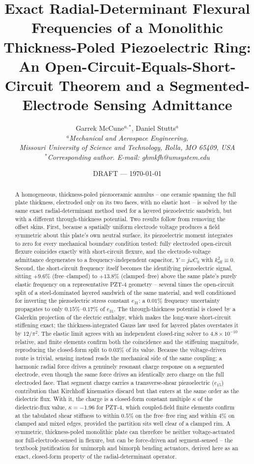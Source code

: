\documentclass[11pt]{article}
\title{\bfseries Exact Radial-Determinant Flexural Frequencies of a
Monolithic Thickness-Poled Piezoelectric Ring: An Open-Circuit-Equals-Short-Circuit Theorem and a Segmented-Electrode Sensing Admittance}
\author{Garrek McCune$^{a,*}$, Daniel Stutts$^{a}$\\
\small\itshape $^a$Mechanical and Aerospace Engineering,\\
Missouri University of Science and Technology, Rolla, MO 65409, USA\\
\small\upshape $^*$Corresponding author. E-mail: ghmkfh@umsystem.edu}
\date{DRAFT --- \today}
\begin{document}
\maketitle

\begin{abstract}
A homogeneous, thickness-poled piezoceramic annulus -- one ceramic
spanning the full plate thickness, electroded only on its two faces, with
no elastic host -- is solved by the same exact radial-determinant method
used for a layered piezoelectric sandwich, but with a different
through-thickness potential. Two results follow from removing the offset
skins. First, because a spatially uniform electrode voltage produces a
field symmetric about this plate's own neutral surface, its piezoelectric
moment integrates to zero for every mechanical boundary condition tested:
fully electroded open-circuit flexure coincides exactly with short-circuit
flexure, and the electrode-voltage admittance degenerates to a
frequency-independent capacitor, $Y=j\omega C_0$ with
$k_{\mathrm{eff}}^2\equiv0$. Second, the short-circuit frequency itself
becomes the identifying piezoelectric signal, sitting $+9.6\%$
(free--clamped) to $+13.8\%$ (clamped--free) above the same plate's purely
elastic frequency on a representative PZT-4 geometry -- several times
the open-circuit split of a steel-dominated layered sandwich of the same
material, and well conditioned for inverting the piezoelectric
stress constant $e_{31}$: a $0.01\%$ frequency uncertainty propagates to
only $0.15\%$--$0.17\%$ of $e_{31}$. The through-thickness potential is
closed by a Galerkin projection of the electric enthalpy, which makes the
long-wave short-circuit stiffening exact; the thickness-integrated Gauss
law used for layered plates overstates it by $12/\pi^2$. The elastic
limit agrees with an independent closed-ring solver to
$4.8\times10^{-10}$ relative, and finite elements confirm both the
coincidence and the stiffening magnitude, reproducing the closed-form
split to $0.03\%$ of its value. Because the voltage-driven route
is trivial, sensing instead reads the mechanical side of the same
coupling: a harmonic radial force drives a genuinely resonant charge
response on a segmented electrode, even though the same force drives an
identically zero charge on the full electroded face. That segment charge
carries a transverse-shear piezoelectric ($e_{15}$) contribution that
Kirchhoff kinematics discard but that enters at the same order as the
dielectric flux. With it, the charge is a closed-form constant multiple
$\kappa$ of the dielectric-flux value, $\kappa=-1.96$ for PZT-4, which
coupled-field finite elements confirm at the tabulated shear stiffness
to within $0.5\%$ on the free--free ring and within $4\%$ on clamped and
mixed edges, provided the partition sits well clear of a clamped
rim. A symmetric,
thickness-poled monolithic plate can therefore be neither voltage-actuated
nor full-electrode-sensed in flexure, but can be force-driven and
segment-sensed -- the textbook justification for unimorph and bimorph
bending actuators, derived here as an exact, closed-form property of the
radial-determinant operator.
\end{abstract}
\end{document}
